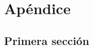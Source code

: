 \pagestyle{fancy}
\fancyhead[LE,RO]{\thepage}
\fancyhead[LO]{\nouppercase{\rightmark}}

\chapter{Apéndice}

\minitoc

\section{Primera sección}


\chapterend